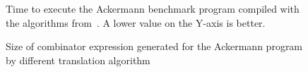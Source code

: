 \documentclass[conference]{IEEEtran}
\DeclareMathOperator{\strict}{strict}
\DeclareMathOperator{\lazy}{lazy}
\DeclareMathOperator{\lazyeta}{lazy_\eta}
\DeclareMathOperator{\linear}{linear}
\begin{document}
\begin{figure}
    
    \centering
    \caption{Time to execute the Ackermann benchmark program compiled with the algorithms from~\cite{kiselyov_lambda_2018}. A lower value on the Y-axis is better.}
    \label{fig:ack-bracket-vs-kiselyov}
\end{figure}

\begin{figure}
    \centering
    \caption{Size of combinator expression generated for the Ackermann program by different translation algorithm}
    \label{fig:ack-sizes}
\end{figure}
\end{document}
